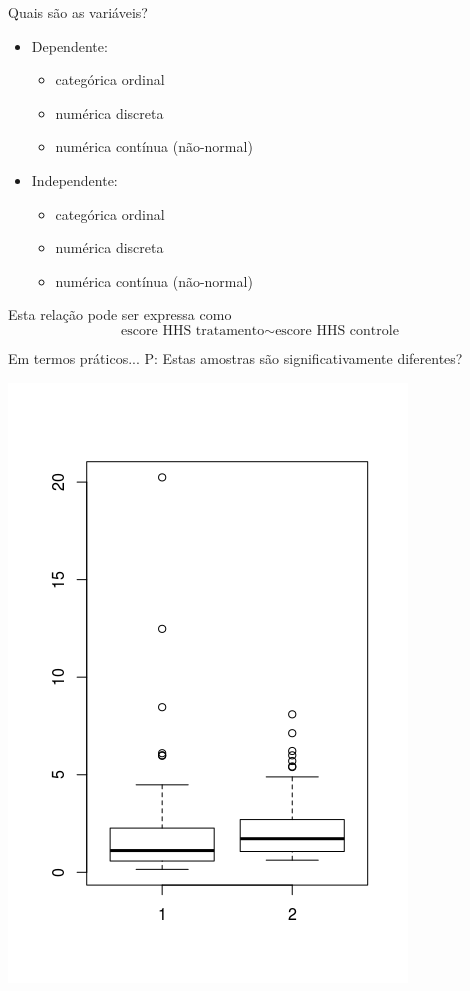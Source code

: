\documentclass{beamer}
\begin{document}
\begin{frame}{Quais são as variáveis?}
  \begin{itemize}
    \small
  \item Dependente:
    \begin{itemize}
      \footnotesize
    \item categórica ordinal
    \item numérica discreta
    \item numérica contínua (não-normal)
    \end{itemize}
  \item Independente:
    \begin{itemize}
      \footnotesize
    \item categórica ordinal
    \item numérica discreta
    \item numérica contínua (não-normal)
    \end{itemize}
  \end{itemize}
  \vfill
  \begin{block}{Esta relação pode ser expressa como}
    \small
    \begin{displaymath}
      \text{escore HHS tratamento} \sim \text{escore HHS controle}
    \end{displaymath}
  \end{block}
\end{frame}

\begin{frame}{Em termos práticos...}
P: Estas amostras são significativamente diferentes?

  \centering
  \includegraphics[height=\textheight]{Cap37-38/2samples-bp}
\end{frame}
\end{document}
